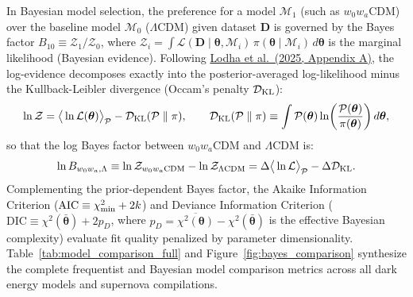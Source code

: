 \documentclass[11pt,letterpaper]{article}
\begin{document}
In Bayesian model selection, the preference for a model $\mathcal{M}_1$ (such as $w_0 w_a$CDM) over the baseline model $\mathcal{M}_0$ ($\Lambda$CDM) given dataset $\mathbf{D}$ is governed by the Bayes factor $B_{10} \equiv \mathcal{Z}_1 / \mathcal{Z}_0$, where $\mathcal{Z}_i = \int \mathcal{L}(\mathbf{D}\mid\boldsymbol{\theta}, \mathcal{M}_i)\, \pi(\boldsymbol{\theta}\mid\mathcal{M}_i)\, d\boldsymbol{\theta}$ is the marginal likelihood (Bayesian evidence). Following \href{https://arxiv.org/abs/2503.14743}{Lodha et al.\ (2025, Appendix A)}, the log-evidence decomposes exactly into the posterior-averaged log-likelihood minus the Kullback-Leibler divergence (Occam's penalty $\mathcal{D}_{\rm KL}$):
\begin{equation}
    \ln \mathcal{Z} = \big\langle \ln \mathcal{L}(\boldsymbol{\theta}) \big\rangle_{\mathcal{P}} - \mathcal{D}_{\rm KL}(\mathcal{P} \parallel \pi), \qquad \mathcal{D}_{\rm KL}(\mathcal{P} \parallel \pi) \equiv \int \mathcal{P}(\boldsymbol{\theta}) \ln\!\left( \frac{\mathcal{P}(\boldsymbol{\theta})}{\pi(\boldsymbol{\theta})} \right) d\boldsymbol{\theta},
    \label{eq:evidence_kl}
\end{equation}
so that the log Bayes factor between $w_0 w_a$CDM and $\Lambda$CDM is:
\begin{equation}
    \ln B_{w_0 w_a, \Lambda} \equiv \ln \mathcal{Z}_{w_0 w_a\text{CDM}} - \ln \mathcal{Z}_{\Lambda\text{CDM}} = \Delta \big\langle \ln \mathcal{L} \big\rangle_{\mathcal{P}} - \Delta \mathcal{D}_{\rm KL}.
    \label{eq:bayes_factor_decomp}
\end{equation}
Complementing the prior-dependent Bayes factor, the Akaike Information Criterion ($\text{AIC} \equiv \chi^2_{\rm min} + 2k$) and Deviance Information Criterion ($\text{DIC} \equiv \chi^2(\bar{\boldsymbol{\theta}}) + 2 p_D$, where $p_D = \overline{\chi^2(\boldsymbol{\theta})} - \chi^2(\bar{\boldsymbol{\theta}})$ is the effective Bayesian complexity) evaluate fit quality penalized by parameter dimensionality. Table~\ref{tab:model_comparison_full} and Figure~\ref{fig:bayes_comparison} synthesize the complete frequentist and Bayesian model comparison metrics across all dark energy models and supernova compilations.
\end{document}
